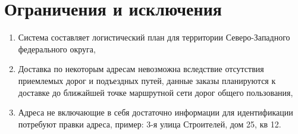 \section{Ограничения и исключения}
\label{sec:limit}
\begin{enumerate}[label=LMT-\arabic*]
    \item Система составляет логистический план для территории Северо-Западного федерального округа,
    \item Доставка по некоторым адресам невозможна вследствие отсутствия приемлемых дорог и подъездных путей, данные заказы планируются к доставке до ближайшей точке маршрутной сети дорог общего пользования,
    \item Адреса не включающие в себя достаточно информации для идентификации потребуют правки адреса, пример: 3-я улица Строителей, дом 25, кв 12.
\end{enumerate}

\endinput
